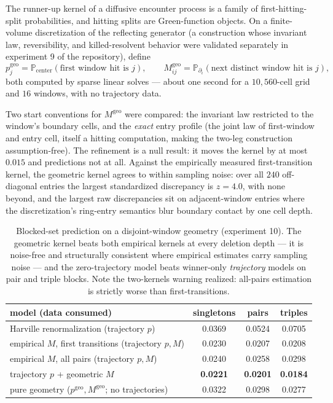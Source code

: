 \documentclass[11pt]{article}
\theoremstyle{remark}
\newcommand{\Prob}{\mathbb{P}}
\begin{document}
The runner-up kernel of a diffusive encounter process is a family of
first-hitting-split probabilities, and hitting splits are Green-function objects.
On a finite-volume discretization of the reflecting generator (a construction whose
invariant law, reversibility, and killed-resolvent behavior were validated
separately in experiment 9 of the repository), define
\[
p^{\mathrm{geo}}_j = \Prob_{\text{center}}(\text{first window hit is } j),
\qquad
M^{\mathrm{geo}}_{ij} = \Prob_{\partial_i}(\text{next distinct window hit is } j),
\]
both computed by sparse linear solves --- about one second for a
$10{,}560$-cell grid and $16$ windows, with no trajectory data.

Two start conventions for $M^{\mathrm{geo}}$ were compared: the invariant law
restricted to the window's boundary cells, and the \emph{exact} entry profile
(the joint law of first-window and entry cell, itself a hitting computation, making
the two-leg construction assumption-free). The refinement is a null result: it
moves the kernel by at most $0.015$ and predictions not at all. Against the
empirically measured first-transition kernel, the geometric kernel agrees to within
sampling noise: over all $240$ off-diagonal entries the largest standardized
discrepancy is $z = 4.0$, with none beyond, and the largest raw discrepancies sit
on adjacent-window entries where the discretization's ring-entry semantics blur
boundary contact by one cell depth.

\begin{table}[h]
\centering
\begin{tabular}{lccc}
\toprule
model (data consumed) & singletons & pairs & triples \\
\midrule
Harville renormalization (trajectory $p$) & 0.0369 & 0.0524 & 0.0705 \\
empirical $M$, first transitions (trajectory $p, M$) & 0.0230 & 0.0207 & 0.0208 \\
empirical $M$, all pairs (trajectory $p, M$) & 0.0240 & 0.0258 & 0.0298 \\
trajectory $p$ + geometric $M$ & \textbf{0.0221} & \textbf{0.0201} & \textbf{0.0184} \\
pure geometry ($p^{\mathrm{geo}}, M^{\mathrm{geo}}$; no trajectories) & 0.0322 & 0.0298 & 0.0277 \\
\bottomrule
\end{tabular}
\caption{Blocked-set prediction on a disjoint-window geometry (experiment 10).
The geometric kernel beats both empirical kernels at every deletion depth --- it is
noise-free and structurally consistent where empirical estimates carry sampling
noise --- and the zero-trajectory model beats winner-only \emph{trajectory} models
on pair and triple blocks. Note the two-kernels warning realized: all-pairs
estimation is strictly worse than first-transitions.}
\label{tab:exp10}
\end{table}
\end{document}

